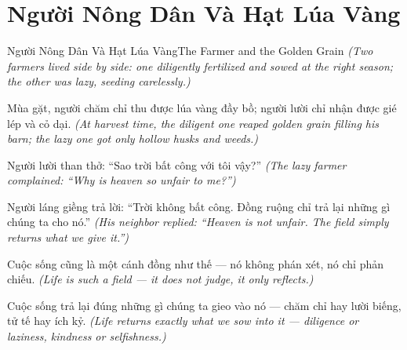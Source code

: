 \section{Người Nông Dân Và Hạt Lúa Vàng}
\begin{truyen}{Người Nông Dân Và Hạt Lúa Vàng}{The Farmer and the Golden Grain}
\textit{(Two farmers lived side by side: one diligently fertilized and sowed at the right season; the other was lazy, seeding carelessly.)}

Mùa gặt, người chăm chỉ thu được lúa vàng đầy bồ; người lười chỉ nhận được gié lép và cỏ dại.
\textit{(At harvest time, the diligent one reaped golden grain filling his barn; the lazy one got only hollow husks and weeds.)}

Người lười than thở: ``Sao trời bất công với tôi vậy?''
\textit{(The lazy farmer complained: ``Why is heaven so unfair to me?'')}

Người láng giềng trả lời: ``Trời không bất công. Đồng ruộng chỉ trả lại những gì chúng ta cho nó.''
\textit{(His neighbor replied: ``Heaven is not unfair. The field simply returns what we give it.'')}

Cuộc sống cũng là một cánh đồng như thế — nó không phán xét, nó chỉ phản chiếu.
\textit{(Life is such a field — it does not judge, it only reflects.)}

\end{truyen}

\begin{baihoc}
Cuộc sống trả lại đúng những gì chúng ta gieo vào nó — chăm chỉ hay lười biếng, tử tế hay ích kỷ.
\textit{(Life returns exactly what we sow into it — diligence or laziness, kindness or selfishness.)}
\end{baihoc}
\ngancach

